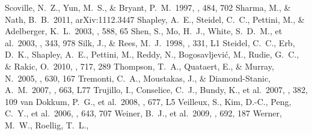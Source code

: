 \documentclass[apj]{emulateapj}
\begin{document}
\begin{thebibliography}{}
 Scoville, N.~Z., Yun, M.~S., \&
  Bryant, P.~M.\ 1997, \apj, 484, 702
 Sharma, M., \& Nath,
  B.~B.\ 2011, arXiv:1112.3447
 Shapley, A.~E., Steidel, C.~C.,
  Pettini, M., \& Adelberger, K.~L.\ 2003, \apj, 588, 65
 Shen, S., Mo, H.~J., White,
  S.~D.~M., et al.\ 2003, \mnras, 343, 978
 Silk, J., \& Rees, M.~J.\ 1998,
  \aap, 331, L1
 Steidel, C.~C., Erb, D.~K.,
  Shapley, A.~E., Pettini, M., Reddy, N., Bogosavljevi{\'c}, M.,
  Rudie, G.~C., \& Rakic, O.\ 2010, \apj, 717, 289
 Thompson, T.~A., Quataert, E.,
  \& Murray, N.\ 2005, \apj, 630, 167
 Tremonti, C.~A., Moustakas, J.,
  \& Diamond-Stanic, A.~M.\ 2007, \apjl, 663, L77
 Trujillo, I., Conselice, C.~J.,
  Bundy, K., et al.\ 2007, \mnras, 382, 109
 van Dokkum, P.~G., et
  al.\ 2008, \apjl, 677, L5
 Veilleux, S., Kim, D.-C., Peng,
  C.~Y., et al.\ 2006, \apj, 643, 707
 Weiner, B.~J., et al.\ 2009,
  \apj, 692, 187
 Werner, M.~W., Roellig, T.~L.,

\end{thebibliography}
\end{document}
